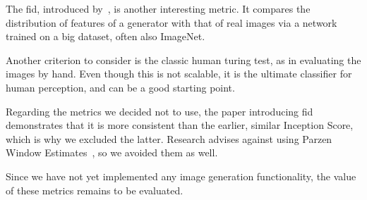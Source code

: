 The \ac{fid}, introduced by~\cite{fid}, is another interesting metric.
It compares the distribution of features of a generator with that of real images via a network trained on a big
dataset, often also ImageNet.

Another criterion to consider is the classic human turing test, as in evaluating the images by hand.
Even though this is not scalable, it is the ultimate classifier for human perception, and can be a good starting
point.

Regarding the metrics we decided not to use, the paper introducing \ac{fid} demonstrates that it is more consistent than the earlier, similar Inception Score, which is why we excluded the latter. Research advises against using Parzen Window Estimates~\cite{note_on_eval}, so we avoided them as well.

Since we have not yet implemented any image generation functionality, the value of these metrics remains to be evaluated.